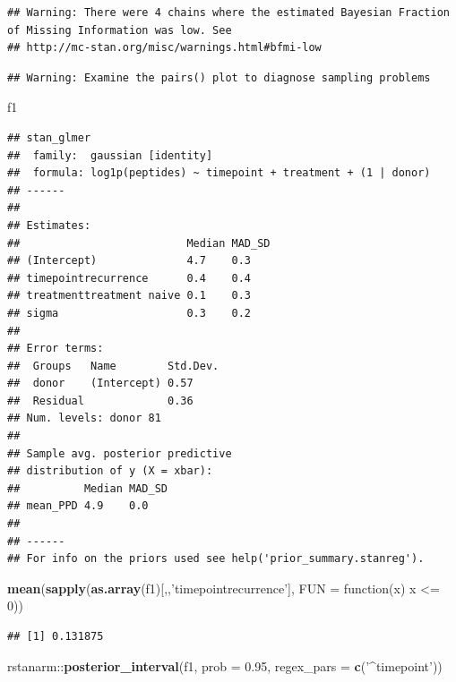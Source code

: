 \documentclass[]{article}
\newenvironment{Shaded}{\begin{snugshade}}{\end{snugshade}}
\newcommand{\KeywordTok}[1]{\textcolor[rgb]{0.13,0.29,0.53}{\textbf{{#1}}}}
\newcommand{\DataTypeTok}[1]{\textcolor[rgb]{0.13,0.29,0.53}{{#1}}}
\newcommand{\DecValTok}[1]{\textcolor[rgb]{0.00,0.00,0.81}{{#1}}}
\newcommand{\FloatTok}[1]{\textcolor[rgb]{0.00,0.00,0.81}{{#1}}}
\newcommand{\StringTok}[1]{\textcolor[rgb]{0.31,0.60,0.02}{{#1}}}
\newcommand{\NormalTok}[1]{{#1}}
\begin{document}
\begin{verbatim}
## Warning: There were 4 chains where the estimated Bayesian Fraction of Missing Information was low. See
## http://mc-stan.org/misc/warnings.html#bfmi-low
\end{verbatim}

\begin{verbatim}
## Warning: Examine the pairs() plot to diagnose sampling problems
\end{verbatim}

\begin{Shaded}
\begin{Highlighting}[]
\NormalTok{f1}
\end{Highlighting}
\end{Shaded}

\begin{verbatim}
## stan_glmer
##  family:  gaussian [identity]
##  formula: log1p(peptides) ~ timepoint + treatment + (1 | donor)
## ------
## 
## Estimates:
##                          Median MAD_SD
## (Intercept)              4.7    0.3   
## timepointrecurrence      0.4    0.4   
## treatmenttreatment naive 0.1    0.3   
## sigma                    0.3    0.2   
## 
## Error terms:
##  Groups   Name        Std.Dev.
##  donor    (Intercept) 0.57    
##  Residual             0.36    
## Num. levels: donor 81 
## 
## Sample avg. posterior predictive 
## distribution of y (X = xbar):
##          Median MAD_SD
## mean_PPD 4.9    0.0   
## 
## ------
## For info on the priors used see help('prior_summary.stanreg').
\end{verbatim}

\begin{Shaded}
\begin{Highlighting}[]
\KeywordTok{mean}\NormalTok{(}\KeywordTok{sapply}\NormalTok{(}\KeywordTok{as.array}\NormalTok{(f1)[,,}\StringTok{'timepointrecurrence'}\NormalTok{], }\DataTypeTok{FUN =} \NormalTok{function(x) x <=}\StringTok{ }\DecValTok{0}\NormalTok{))}
\end{Highlighting}
\end{Shaded}

\begin{verbatim}
## [1] 0.131875
\end{verbatim}

\begin{Shaded}
\begin{Highlighting}[]
\NormalTok{rstanarm::}\KeywordTok{posterior_interval}\NormalTok{(f1, }\DataTypeTok{prob =} \FloatTok{0.95}\NormalTok{, }\DataTypeTok{regex_pars =} \KeywordTok{c}\NormalTok{(}\StringTok{'^timepoint'}\NormalTok{))}
\end{Highlighting}
\end{Shaded}
\end{document}
